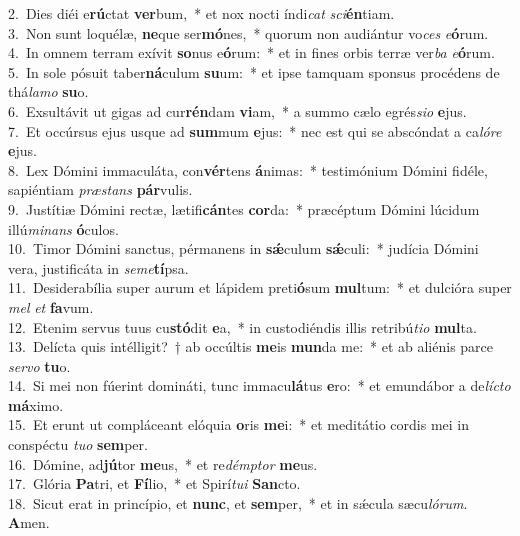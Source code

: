 {2.~}Dies diéi e\textbf{rú}ctat \textbf{ver}bum,~* et nox nocti índi\textit{cat} \textit{sci}\textbf{én}tiam.\\
{3.~}Non sunt loquélæ, \textbf{ne}que ser\textbf{mó}nes,~* quorum non audiántur vo\textit{ces} \textit{e}\textbf{ó}rum.\\
{4.~}In omnem terram exívit \textbf{so}nus e\textbf{ó}rum:~* et in fines orbis terræ ver\textit{ba} \textit{e}\textbf{ó}rum.\\
{5.~}In sole pósuit taber\textbf{ná}culum \textbf{su}um:~* et ipse tamquam sponsus procédens de thá\textit{la}\textit{mo} \textbf{su}o.\\
{6.~}Exsultávit ut gigas ad cur\textbf{rén}dam \textbf{vi}am,~* a summo cælo egrés\textit{si}\textit{o} \textbf{e}jus.\\
{7.~}Et occúrsus ejus usque ad \textbf{sum}mum \textbf{e}jus:~* nec est qui se abscóndat a ca\textit{ló}\textit{re} \textbf{e}jus.\\
{8.~}Lex Dómini immaculáta, con\textbf{vér}tens \textbf{á}nimas:~* testimónium Dómini fidéle, sapiéntiam \textit{præ}\textit{stans} \textbf{pár}vulis.\\
{9.~}Justítiæ Dómini rectæ, lætifi\textbf{cán}tes \textbf{cor}da:~* præcéptum Dómini lúcidum illú\textit{mi}\textit{nans} \textbf{ó}culos.\\
{10.~}Timor Dómini sanctus, pérmanens in \textbf{sǽ}culum \textbf{sǽ}culi:~* judícia Dómini vera, justificáta in \textit{se}\textit{me}\textbf{tí}psa.\\
{11.~}Desiderabília super aurum et lápidem preti\textbf{ó}sum \textbf{mul}tum:~* et dulcióra super \textit{mel} \textit{et} \textbf{fa}vum.\\
{12.~}Etenim servus tuus cu\textbf{stó}dit \textbf{e}a,~* in custodiéndis illis retribú\textit{ti}\textit{o} \textbf{mul}ta.\\
{13.~}Delícta quis intélligit?~† ab occúltis \textbf{me}is \textbf{mun}da me:~* et ab aliénis parce \textit{ser}\textit{vo} \textbf{tu}o.\\
{14.~}Si mei non fúerint domináti, tunc immacu\textbf{lá}tus \textbf{e}ro:~* et emundábor a de\textit{lí}\textit{cto} \textbf{má}ximo.\\
{15.~}Et erunt ut compláceant elóquia \textbf{o}ris \textbf{me}i:~* et meditátio cordis mei in conspéctu \textit{tu}\textit{o} \textbf{sem}per.\\
{16.~}Dómine, ad\textbf{jú}tor \textbf{me}us,~* et re\textit{dém}\textit{ptor} \textbf{me}us.\\
{17.~}Glória \textbf{Pa}tri, et \textbf{Fí}lio,~* et Spirí\textit{tu}\textit{i} \textbf{San}cto.\\
{18.~}Sicut erat in princípio, et \textbf{nunc}, et \textbf{sem}per,~* et in sǽcula sæcu\textit{ló}\textit{rum}. \textbf{A}men.\\
